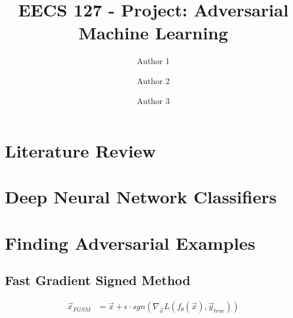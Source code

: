 \documentclass{amsart}
\title{EECS 127 - Project: Adversarial Machine Learning}  %
\author{Author 1}
\author{Author 2}  %
\author{Author 3}  %
\begin{document}
\maketitle

\tableofcontents

\pagebreak

\section{Literature Review}



\pagebreak

\section{Deep Neural Network Classifiers}



\pagebreak

\section{Finding Adversarial Examples}

\subsection{Fast Gradient Signed Method}

\begin{align*}
    \vec{x}_{FGSM} &= \vec{x} + \epsilon \cdot sgn(\nabla_{\vec{x}} L(f_{\theta}(\vec{x}), \vec{y}_{true}))
\end{align*}
\end{document}
